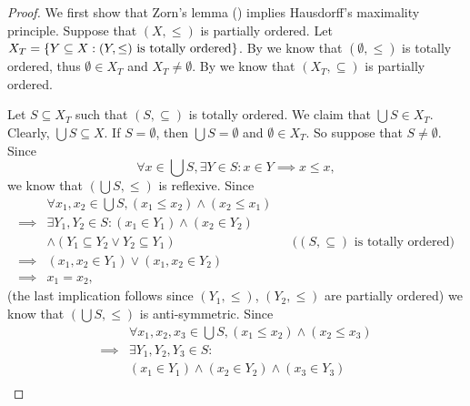 \begin{proof}
  We first show that Zorn's lemma () implies Hausdorff's maximality principle.
  Suppose that \((X, \leq)\) is partially ordered.
  Let \(X_T = \left\lbrace Y \subseteq X : (Y, \leq) \text{ is totally ordered}\right\rbrace\).
  By  we know that \((\emptyset, \leq)\) is totally ordered, thus \(\emptyset \in X_T\) and \(X_T \neq \emptyset\).
  By  we know that \((X_T, \subseteq)\) is partially ordered.

  Let \(S \subseteq X_T\) such that \((S, \subseteq)\) is totally ordered.
  We claim that \(\bigcup S \in X_T\).
  Clearly, \(\bigcup S \subseteq X\).
  If \(S = \emptyset\), then \(\bigcup S = \emptyset\) and \(\emptyset \in X_T\).
  So suppose that \(S \neq \emptyset\).
  Since
  \[
    \forall x \in \bigcup S, \exists Y \in S : x \in Y \implies x \leq x,
  \]
  we know that \((\bigcup S, \leq)\) is reflexive.
  Since
  \begin{align*}
             & \forall x_1, x_2 \in \bigcup S, (x_1 \leq x_2) \land (x_2 \leq x_1)                                                     \\
    \implies & \exists Y_1, Y_2 \in S : (x_1 \in Y_1) \land (x_2 \in Y_2)                                                              \\
             & \land (Y_1 \subseteq Y_2 \lor Y_2 \subseteq Y_1)                    &  & \text{(\((S, \subseteq)\) is totally ordered)} \\
    \implies & (x_1, x_2 \in Y_1) \lor (x_1, x_2 \in Y_2)                                                                              \\
    \implies & x_1 = x_2,
  \end{align*}
  (the last implication follows since \((Y_1, \leq)\), \((Y_2, \leq)\) are partially ordered)
  we know that \((\bigcup S, \leq)\) is anti-symmetric.
  Since
  \begin{align*}
             & \forall x_1, x_2, x_3 \in \bigcup S, (x_1 \leq x_2) \land (x_2 \leq x_3)                                                              \\
    \implies & \exists Y_1, Y_2, Y_3 \in S :                                                                                                         \\
             & (x_1 \in Y_1) \land (x_2 \in Y_2) \land (x_3 \in Y_3)                                                                                 \\

\end{align*}
\end{proof}
